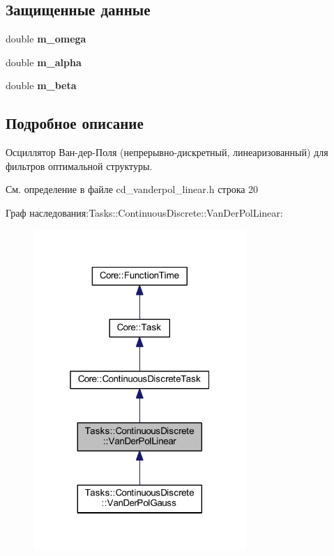 \subsection*{Защищенные данные}
\begin{DoxyCompactItemize}
\item 
\hypertarget{class_tasks_1_1_continuous_discrete_1_1_van_der_pol_linear_a974f4658bee500533be49e053f15172f}{}\label{class_tasks_1_1_continuous_discrete_1_1_van_der_pol_linear_a974f4658bee500533be49e053f15172f} 
double {\bfseries m\+\_\+omega}
\item 
\hypertarget{class_tasks_1_1_continuous_discrete_1_1_van_der_pol_linear_a6e09423b369c869ea4721e465845912a}{}\label{class_tasks_1_1_continuous_discrete_1_1_van_der_pol_linear_a6e09423b369c869ea4721e465845912a} 
double {\bfseries m\+\_\+alpha}
\item 
\hypertarget{class_tasks_1_1_continuous_discrete_1_1_van_der_pol_linear_a9ca2f773ce65c2b69fea3a4a451afd59}{}\label{class_tasks_1_1_continuous_discrete_1_1_van_der_pol_linear_a9ca2f773ce65c2b69fea3a4a451afd59} 
double {\bfseries m\+\_\+beta}
\end{DoxyCompactItemize}


\subsection{Подробное описание}
Осциллятор Ван-\/дер-\/Поля (непрерывно-\/дискретный, линеаризованный) для фильтров оптимальной структуры. 

См. определение в файле cd\+\_\+vanderpol\+\_\+linear.\+h строка 20



Граф наследования\+:Tasks\+:\+:Continuous\+Discrete\+:\+:Van\+Der\+Pol\+Linear\+:\nopagebreak
\begin{figure}[H]
\begin{center}
\leavevmode
\includegraphics[width=229pt]{class_tasks_1_1_continuous_discrete_1_1_van_der_pol_linear__inherit__graph}
\end{center}
\end{figure}



